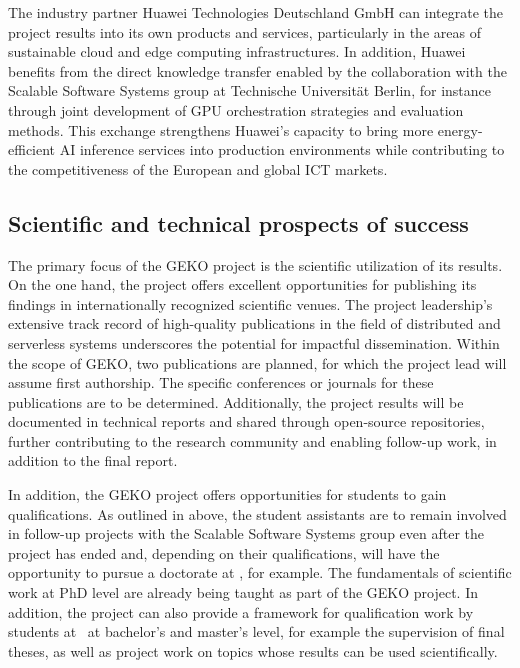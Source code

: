 The industry partner Huawei Technologies Deutschland GmbH can integrate the project results into its own products and services, particularly in the areas of sustainable cloud and edge computing infrastructures. In addition, Huawei benefits from the direct knowledge transfer enabled by the collaboration with the Scalable Software Systems group at Technische Universität Berlin, for instance through joint development of GPU orchestration strategies and evaluation methods. This exchange strengthens Huawei's capacity to bring more energy-efficient AI inference services into production environments while contributing to the competitiveness of the European and global ICT markets.

\subsection{Scientific and technical prospects of success}
\label{sec:verwertungsplan:wissenschaft}


The primary focus of the GEKO project is the scientific utilization of its results.
On the one hand, the project offers excellent opportunities for publishing its findings in internationally recognized scientific venues.
The project leadership's extensive track record of high-quality publications in the field of distributed and serverless systems underscores the potential for impactful dissemination.
Within the scope of GEKO, two publications are planned, for which the project lead will assume first authorship.
The specific conferences or journals for these publications are to be determined.
Additionally, the project results will be documented in technical reports and shared through open-source repositories, further contributing to the research community and enabling follow-up work, in addition to the final report.

In addition, the GEKO project offers opportunities for students to gain qualifications.
As outlined in above, the student assistants are to remain involved in follow-up projects with the Scalable Software Systems group even after the project has ended and, depending on their qualifications, will have the opportunity to pursue a doctorate at \TU{}, for example.
The fundamentals of scientific work at PhD level are already being taught as part of the GEKO project.
In addition, the project can also provide a framework for qualification work by students at \TU\ at bachelor's and master's level, for example the supervision of final theses, as well as project work on topics whose results can be used scientifically.

